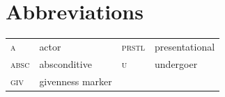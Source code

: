 \documentclass[output=collectionpaper]{langsci/langscibook}
\begin{document}
\section*{Abbreviations}

\begin{tabular}{llll}
\textsc{a} &actor & \textsc{prstl} & presentational \\
\textsc{absc} & absconditive  & \textsc{u} & undergoer \\
\textsc{giv} & givenness marker &&\\
\end{tabular}


\printbibliography[heading=subbibliography,notkeyword=this]
\end{document}
